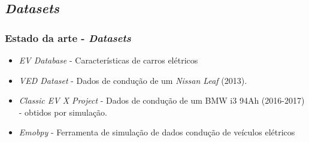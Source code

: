 \documentclass{beamer}
\begin{document}
\subsection[\textit{Datasets}]{\textit{Datasets}}
\begin{frame}
\frametitle{Estado da arte - \textit{Datasets}}
\vspace{0.6cm}
\begin{itemize}
	\item \textit{EV Database} 
	- Características de carros elétricos
\end{itemize}
\vspace{0.5cm}
\begin{itemize}
	\item \textit{VED Dataset} 
		  - Dados de condução de um \textit{Nissan Leaf} (2013).
	\item \textit{Classic EV X Project} 
	- Dados de condução de um BMW i3 94Ah (2016-2017) - obtidos por simulação.
	\item \textit{Emobpy} 
		  - Ferramenta de simulação de dados condução de veículos elétricos
\end{itemize}
\vspace{1cm}
\end{frame}
\end{document}

